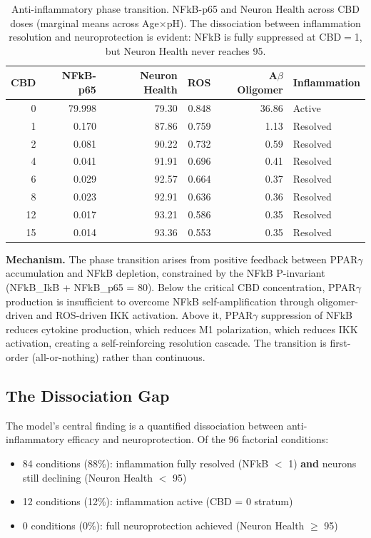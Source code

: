 \documentclass[10pt,letterpaper]{article}
\begin{document}
\begin{table}[htbp]
\centering
\caption{Anti-inflammatory phase transition. NFkB-p65 and Neuron Health across CBD doses (marginal means across Age$\times$pH). The dissociation between inflammation resolution and neuroprotection is evident: NFkB is fully suppressed at CBD$=$1, but Neuron Health never reaches 95.}
\label{tab:phase_transition}
\begin{tabular}{rrrrrl}
\toprule
CBD & NFkB-p65 & Neuron Health & ROS & A$\beta$ Oligomer & Inflammation \\
\midrule
0   & 79.998 & 79.30  & 0.848 & 36.86  & Active \\
\rowcolor{gray!20} 1   & 0.170  & 87.86  & 0.759 & 1.13   & Resolved \\
2   & 0.081  & 90.22  & 0.732 & 0.59   & Resolved \\
4   & 0.041  & 91.91  & 0.696 & 0.41   & Resolved \\
6   & 0.029  & 92.57  & 0.664 & 0.37   & Resolved \\
8   & 0.023  & 92.91  & 0.636 & 0.36   & Resolved \\
12  & 0.017  & 93.21  & 0.586 & 0.35   & Resolved \\
15  & 0.014  & 93.36  & 0.553 & 0.35   & Resolved \\
\bottomrule
\end{tabular}
\end{table}

\vspace{3pt}
\noindent\textbf{Mechanism.} The phase transition arises from positive feedback between PPAR$\gamma$ accumulation and NFkB depletion, constrained by the NFkB P-invariant (NFkB\_IkB + NFkB\_p65 = 80). Below the critical CBD concentration, PPAR$\gamma$ production is insufficient to overcome NFkB self-amplification through oligomer-driven and ROS-driven IKK activation. Above it, PPAR$\gamma$ suppression of NFkB reduces cytokine production, which reduces M1 polarization, which reduces IKK activation, creating a self-reinforcing resolution cascade. The transition is first-order (all-or-nothing) rather than continuous.

\subsection{The Dissociation Gap}

The model's central finding is a quantified dissociation between anti-inflammatory efficacy and neuroprotection. Of the 96 factorial conditions:
\begin{itemize}
\item 84 conditions (88\%): inflammation fully resolved (NFkB $<$ 1) \textbf{and} neurons still declining (Neuron Health $<$ 95)
\item 12 conditions (12\%): inflammation active (CBD = 0 stratum)
\item 0 conditions (0\%): full neuroprotection achieved (Neuron Health $\geq$ 95)
\end{itemize}
\end{document}
